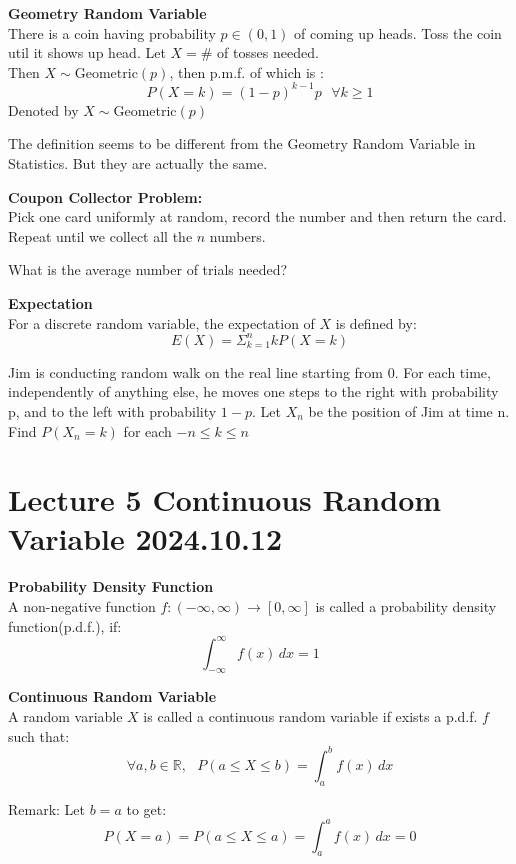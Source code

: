 \documentclass{article}
\begin{document}
\begin{definition}
    \textbf{Geometry Random Variable}\\
    There is a coin having probability $ p \in (0,1)$ of coming up heads. Toss the coin util it shows up head. Let $X = \#$ of tosses needed.\\
    Then $X \sim \text{Geometric}(p)$, then p.m.f. of which is :
    $$ P(X = k) = (1-p)^{k-1}p \text{ } \forall k \geq 1$$
    Denoted by $ X \sim \text{Geometric}(p)$
\end{definition}
The definition seems to be different from the Geometry Random Variable in Statistics. But they are actually the same.

\textbf{Coupon Collector Problem:}\\
Pick one card uniformly at random, record the number and then return the card. Repeat until we collect all the $n$ numbers.

What is the average number of trials needed?

\begin{definition}
    \textbf{Expectation}\\
    For a discrete random variable, the expectation of $X$ is defined by:
    $$ E(X) = \Sigma^n_{k=1}kP(X=k)$$
\end{definition}

\begin{quiz}
    Jim is conducting random walk on the real line starting from 0. For each time, independently of anything else, he moves one steps to the right with probability p, and to the left with probability $1-p$. Let $X_n$ be the position of Jim at time n. Find $P(X_n = k)$ for each $-n \leq k \leq n$
\end{quiz}




\section{Lecture 5 Continuous Random Variable 2024.10.12}
\begin{definition}
    \textbf{Probability Density Function}\\
    A non-negative function $f: (-\infty, \infty) \longrightarrow [0,\infty]$ is called a probability density function(p.d.f.), if:
    $$ \int^{\infty}_{-\infty} f(x) \, dx = 1$$
\end{definition}

\begin{definition}
    \textbf{Continuous Random Variable}\\
    A random variable $X$ is called a continuous random variable if exists a p.d.f. $f$ such that:
    $$\forall a,b \in \mathbb{R}, \text{ } P(a \leq X \leq b) = \int^b_a f(x) \, dx$$

\end{definition}
Remark: Let $b=a$ to get:
$$ P(X=a) = P(a\leq X\leq a) = \int^a_a f(x) \, dx = 0$$
\end{document}

